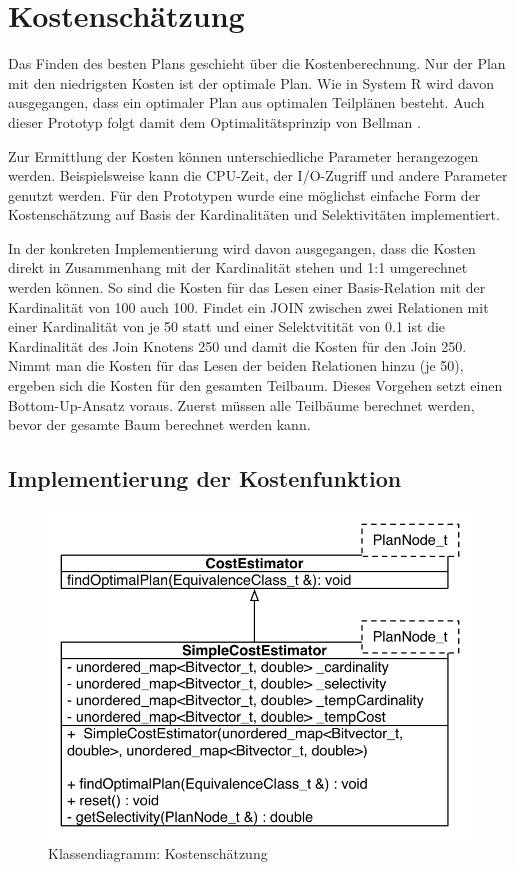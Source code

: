 \section{Kostenschätzung}

Das Finden des besten Plans geschieht über die Kostenberechnung. Nur der Plan mit den niedrigsten Kosten ist der optimale Plan. Wie in System R wird davon ausgegangen, dass ein optimaler Plan aus optimalen Teilplänen besteht. Auch dieser Prototyp folgt damit dem Optimalitätsprinzip von Bellman \cite{Bellman:1957}.

Zur Ermittlung der Kosten können unterschiedliche Parameter herangezogen werden. Beispielsweise kann die CPU-Zeit, der I/O-Zugriff und andere Parameter genutzt werden. Für den Prototypen wurde eine möglichst einfache Form der Kostenschätzung auf Basis der Kardinalitäten und Selektivitäten implementiert.

In der konkreten Implementierung wird davon ausgegangen, dass die Kosten direkt in Zusammenhang mit der Kardinalität stehen und 1:1 umgerechnet werden können. So sind die Kosten für das Lesen einer Basis-Relation mit der Kardinalität von 100 auch 100. Findet ein JOIN zwischen zwei Relationen mit einer Kardinalität von je 50 statt und einer Selektvitität von 0.1 ist die Kardinalität des Join Knotens 250 und damit die Kosten für den Join 250. Nimmt man die Kosten für das Lesen der beiden Relationen hinzu (je 50), ergeben sich die Kosten für den gesamten Teilbaum. Dieses Vorgehen setzt einen Bottom-Up-Ansatz voraus. Zuerst müssen alle Teilbäume berechnet werden, bevor der gesamte Baum berechnet werden kann.

\subsection{Implementierung der Kostenfunktion}


\begin{figure}[ht]
  \centering
  \includegraphics[scale=0.75]{04_Implementierung/00_media/ClassCostEstimation.pdf}
  \caption{Klassendiagramm: Kostenschätzung}
  \label{ClassCostEstimation}
\end{figure}



